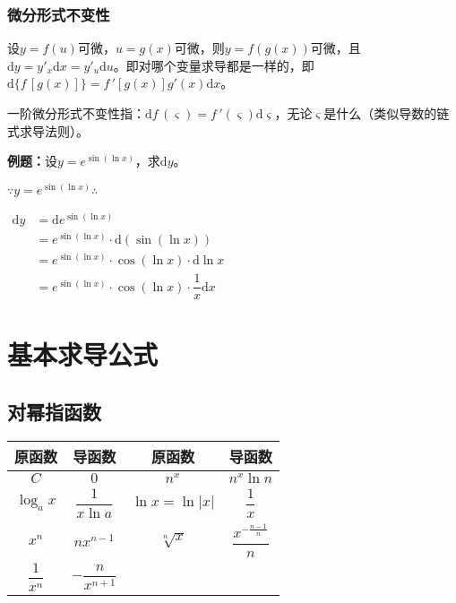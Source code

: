 \documentclass[UTF8, 12pt]{ctexart}
\begin{document}
\subsubsection{微分形式不变性}

设$y=f(u)$可微，$u=g(x)$可微，则$y=f(g(x))$可微，且$\textrm{d}y=y'_{x}\textrm{d}x=y'_{u}\textrm{d}u$。即对哪个变量求导都是一样的，即$\textrm{d}\{f\,[g(x)]\}=f\,'[g(x)]g'(x)\textrm{d}x$。

一阶微分形式不变性指：$\textrm{d}f\,(\varsigma)=f\,'(\varsigma)\textrm{d}\varsigma$，无论$\varsigma$是什么（类似导数的链式求导法则）。

\textbf{例题：}设$y=e^{\sin(\ln x)}$，求$\textrm{d}y$。

$\because y=e^{\sin(\ln x)} \therefore$

$
\begin{aligned}
    \textrm{d}y &=\textrm{d}e^{\sin(\ln x)} \\
    & =e^{\sin(\ln x)}\cdot\textrm{d}(\sin(\ln x)) \\
    & =e^{\sin(\ln x)}\cdot\cos(\ln x)\cdot\textrm{d}\ln x \\
    & =e^{\sin(\ln x)}\cdot\cos(\ln x)\cdot\dfrac{1}{x}\textrm{d}x
\end{aligned}
$

\section{基本求导公式}

\subsection{对幂指函数}

\begin{center}
    \begin{tabular}{|c|c|c|c|}
        \hline
        原函数 & 导函数 & 原函数 & 导函数\\ \hline
        $C$ & $0$ & $n^x$ & $n^x\ln n$ \\ \hline
        $\log_ax$ & $\dfrac{1}{x\ln a}$ & $\ln x=\ln\vert x\vert$ & $\dfrac{1}{x}$ \\ \hline
        $x^n$ & $nx^{n-1}$ & $\sqrt[n]{x}$ & $\dfrac{x^{-\frac{n-1}{n}}}{n}$ \\ \hline
        $\dfrac{1}{x^n}$ & $-\dfrac{n}{x^{n+1}}$ & & \\ 
        \hline
    \end{tabular}
\end{center}
\end{document}

